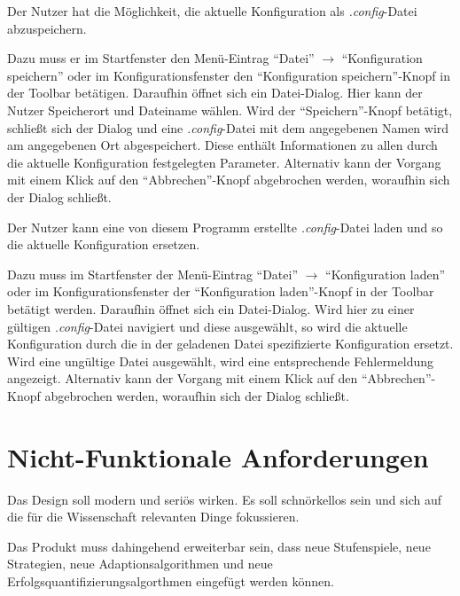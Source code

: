 \documentclass[parskip=full,11pt]{scrartcl}
\begin{document}
Der Nutzer hat die Möglichkeit, die aktuelle Konfiguration als \textit{.config}-Datei abzuspeichern.

Dazu muss er im Startfenster den Menü-Eintrag \enquote{Datei} \(\rightarrow\) \enquote{Konfiguration speichern} oder im Konfigurationsfenster den \enquote{Konfiguration speichern}-Knopf in der Toolbar betätigen. Daraufhin öffnet sich ein Datei-Dialog. Hier kann der Nutzer Speicherort und Dateiname wählen. Wird der \enquote{Speichern}-Knopf betätigt, schließt sich der Dialog und eine \textit{.config}-Datei mit dem angegebenen Namen wird am angegebenen Ort abgespeichert. Diese enthält Informationen zu allen durch die aktuelle Konfiguration festgelegten Parameter. Alternativ kann der Vorgang mit einem Klick auf den \enquote{Abbrechen}-Knopf abgebrochen werden, woraufhin sich der Dialog schließt.

Der Nutzer kann eine von diesem Programm erstellte \textit{.config}-Datei laden und so die aktuelle Konfiguration ersetzen.

Dazu muss im Startfenster der Menü-Eintrag \enquote{Datei} \(\rightarrow\) \enquote{Konfiguration laden} oder im Konfigurationsfenster der \enquote{Konfiguration laden}-Knopf in der Toolbar betätigt werden. Daraufhin öffnet sich ein Datei-Dialog. Wird hier zu einer gültigen \textit{.config}-Datei navigiert und diese ausgewählt, so wird die aktuelle Konfiguration durch die in der geladenen Datei spezifizierte Konfiguration ersetzt. Wird eine ungültige Datei ausgewählt, wird eine entsprechende Fehlermeldung angezeigt. Alternativ kann der Vorgang mit einem Klick auf den \enquote{Abbrechen}-Knopf abgebrochen werden, woraufhin sich der Dialog schließt.

\section{Nicht-Funktionale Anforderungen}


Das Design soll modern und seriös wirken. Es soll schnörkellos sein und sich auf die für die Wissenschaft relevanten Dinge fokussieren.


Das Produkt muss dahingehend erweiterbar sein,
dass neue Stufenspiele, neue Strategien, neue Adaptionsalgorithmen und neue Erfolgsquantifizierungsalgorthmen eingefügt werden können.
\end{document}
